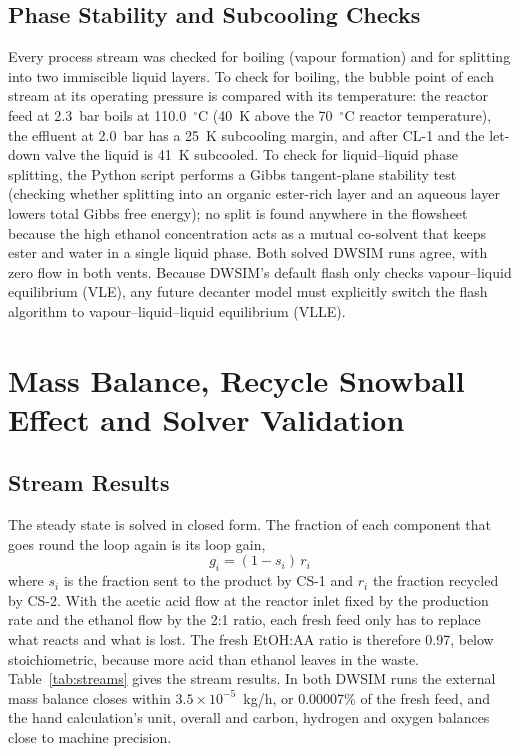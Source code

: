 \documentclass[10pt,a4paper]{article}
\begin{document}
\subsection{Phase Stability and Subcooling Checks}
\label{sec:phase}

Every process stream was checked for boiling (vapour formation) and for splitting into two immiscible liquid layers. To check for boiling, the bubble point of each stream at its operating pressure is compared with its temperature: the reactor feed at 2.3~bar boils at 110.0~$^\circ$C (40~K above the 70~$^\circ$C reactor temperature), the effluent at 2.0~bar has a 25~K subcooling margin, and after CL-1 and the let-down valve the liquid is 41~K subcooled. To check for liquid--liquid phase splitting, the Python script performs a Gibbs tangent-plane stability test (checking whether splitting into an organic ester-rich layer and an aqueous layer lowers total Gibbs free energy); no split is found anywhere in the flowsheet because the high ethanol concentration acts as a mutual co-solvent that keeps ester and water in a single liquid phase. Both solved DWSIM runs agree, with zero flow in both vents. Because DWSIM's default flash only checks vapour--liquid equilibrium (VLE), any future decanter model must explicitly switch the flash algorithm to vapour--liquid--liquid equilibrium (VLLE).

\section{Mass Balance, Recycle Snowball Effect and Solver Validation}

\subsection{Stream Results}

The steady state is solved in closed form. The fraction of each component that goes round the loop again is its loop gain,
\begin{equation}
g_i = (1 - s_i)\, r_i
\label{eq:gain}
\end{equation}
where $s_i$ is the fraction sent to the product by CS-1 and $r_i$ the fraction recycled by CS-2. With the acetic acid flow at the reactor inlet fixed by the production rate and the ethanol flow by the 2:1 ratio, each fresh feed only has to replace what reacts and what is lost. The fresh EtOH:AA ratio is therefore 0.97, below stoichiometric, because more acid than ethanol leaves in the waste. Table~\ref{tab:streams} gives the stream results. In both DWSIM runs the external mass balance closes within $3.5 \times 10^{-5}$~kg/h, or 0.00007\% of the fresh feed, and the hand calculation's unit, overall and carbon, hydrogen and oxygen balances close to machine precision.
\end{document}
